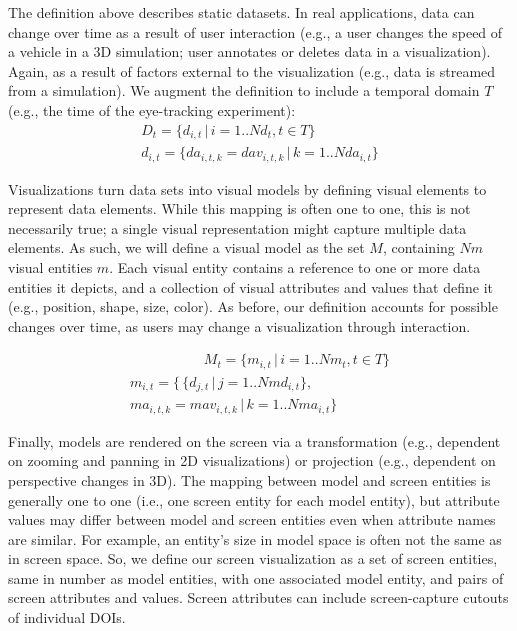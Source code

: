 The definition above describes static datasets. In real applications, data can change over time as a result of user interaction (e.g., a user changes the speed of a vehicle in a 3D simulation; user annotates or deletes data in a visualization). Again, as a result of factors external to the visualization (e.g., data is streamed from a simulation). We augment the definition to include a temporal domain $T$ (e.g., the time of the eye-tracking experiment):
\begin{equation*}
\begin{split}
D_t = \{d_{i,t} \,|\, i=1..N\!d_t, t \in T\} \\
d_{i,t} = \{da_{i,t,k} = dav_{i,t,k} \,|\, k=1..N\!da_{i,t}\}
\end{split}
\end{equation*}

Visualizations turn data sets into visual models by defining visual elements to represent data elements. While this mapping is often one to one, this is not necessarily true; a single visual representation might capture multiple data elements. As such, we will define a visual model as the set $M$, containing $N\!m$ visual entities $m$. Each visual entity contains a reference to one or more data entities it depicts, and a collection of visual attributes and values that define it (e.g., position, shape, size, color). As before, our definition accounts for possible changes over time, as users may change a visualization through interaction.  

\vspace{-4mm}
\begin{multline*}
\qquad\qquad\quad\; M_t = \{m_{i,t} \,|\, i=1..N\!m_t, t \in T\} \\
m_{i,t} = \{\,\{d_{j,t}\,|\, j=1..N\!md_{i,t}\}, \\ ma_{i,t,k} = mav_{i,t,k} \,|\, k=1..N\!ma_{i,t}\}
\end{multline*}

Finally, models are rendered on the screen via a transformation (e.g., dependent on zooming and panning in 2D visualizations) or projection (e.g., dependent on perspective changes in 3D). The mapping between model and screen entities is generally one to one (i.e., one screen entity for each model entity), but attribute values may differ between model and screen entities even when attribute names are similar. For example, an entity's size in model space is often not the same as in screen space. So, we define our screen visualization as a set of screen entities, same in number as model entities, with one associated model entity, and pairs of screen attributes and values. Screen attributes can include screen-capture cutouts of individual DOIs.


